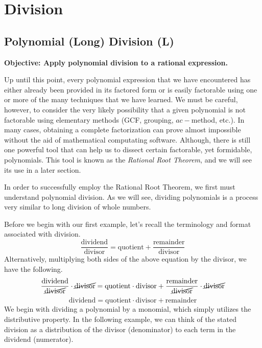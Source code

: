 \documentclass[12pt]{book}
\theoremstyle{definition}
\begin{document}
\section{Division}
\subsection{Polynomial (Long) Division (L)}
{\bf Objective: Apply polynomial division to a rational expression.}\par
Up until this point, every polynomial expression that we have encountered has either already been provided in its factored form or is easily factorable using one or more of the many techniques that we have learned.  We must be careful, however, to consider the very likely possibility that a given polynomial is not factorable using elementary methods (GCF, grouping, $ac-$method, etc.).  In many cases, obtaining a complete factorization can prove almost impossible without the aid of mathematical computating software.  Although, there is still one powerful tool that can help us to dissect certain factorable, yet formidable, polynomials.  This tool is known as the {\it Rational Root Theorem}, and we will see its use in a later section.
\par
In order to successfully employ the Rational Root Theorem, we first must understand polynomial division.  As we will see, dividing polynomials is a process very similar to long division of whole numbers.
\par
Before we begin with our first example, let's recall the terminology and format associated with division.
$$\dfrac{\text{dividend}}{\text{divisor}}=\text{quotient}+\dfrac{\text{remainder}}{\text{divisor}}$$
Alternatively, multiplying both sides of the above equation by the divisor, we have the following.
$$\dfrac{\text{dividend}}{\cancel{\text{divisor}}}\cdot\cancel{\text{divisor}}=\text{quotient}\cdot\text{divisor}+\dfrac{\text{remainder}}{\cancel{\text{divisor}}}\cdot\cancel{\text{divisor}}$$
$$\text{dividend}=\text{quotient}\cdot\text{divisor}+\text{remainder}$$
We begin with dividing a polynomial by a monomial, which simply utilizes the distributive property.  In the following example, we can think of the stated division as a distribution of the divisor (denominator) to each term in the dividend (numerator).  
\end{document}
